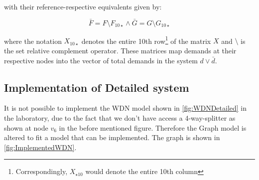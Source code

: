 with their reference-respective equivalents given by:

\begin{equation}\label{eq:FbarGbar}
	\bar{F} = F \setminus F_{10\star} \wedge \bar{G} = G \setminus G_{10\star}
\end{equation}

where the notation $X_{10\star}$ denotes the entire 10th row\footnote{Correspondingly, $X_{\star10}$ would denote the entire 10th column} of the matrix $X$ and $\setminus$ is the set relative complement operator. These matrices map demands at their respective nodes into the vector of total demands in the system $d \vee \bar{d}$.

\newpage
\subsection{Implementation of Detailed system}
It is not possible to implement the WDN model shown in \cref{fig:WDNDetailed} in the laboratory, due to the fact that we don't have access a 4-way-splitter as shown at node $v_6$ in the before mentioned figure. Therefore the Graph model is altered to fit a model that can be implemented. The graph is shown in \cref{fig:ImplementedWDN}.
  
